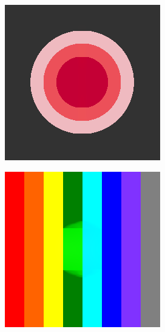 \documentclass[hidelinks, a4paper,12pt]{article}
\numberwithin{equation}{section}							%
\numberwithin{equation}{section}
\begin{document}
{\begin{figure}[H]
\begin{subfigure}{0.4\linewidth}
	\end{subfigure}
	\begin{subfigure}{0.4\linewidth}
		\centering
		\includegraphics[width=0.8\linewidth]{images/result_ex1/splitbergman02.png}
	\end{subfigure}
	\begin{subfigure}{0.4\linewidth}
		\centering
		\includegraphics[width=0.8\linewidth]{images/result_ex1/splitbergman03.png}			
	\end{subfigure}
	\begin{subfigure}{0.4\linewidth}
		\centering

\end{subfigure}
\end{figure}}
\end{document}
